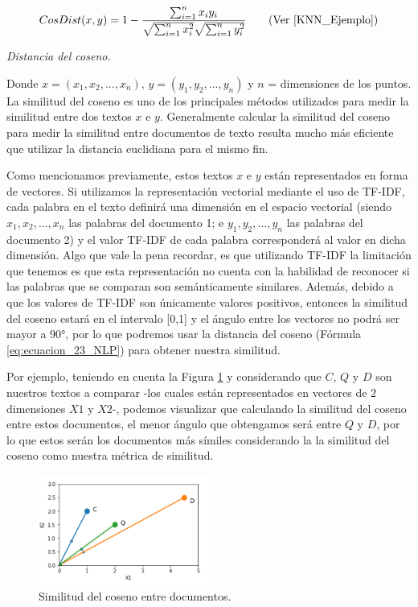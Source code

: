 \documentclass[12pt,a4paper]{article}
\begin{document}
\begin{sloppypar}
\begin{equation}\label{eq:ecuacion_23_NLP}
CosDist(x,y) = 1 - \frac{\sum_{i=1}^{n} x_{i} y_{i}} { \sqrt{\sum_{i=1}^{n} x_{i}^{2}}  \sqrt{\sum_{i=1}^{n} y_{i}^{2}} }     \qquad \text{(Ver \cite{KNN_Ejemplo})}
\end{equation}
\begin{center}
\textit{Distancia del coseno.}
\end{center}

Donde $x= (x_1,x_2,..., x_n)$, $y = (y_1,y_2,...,y_n)$ y $n$ = dimensiones de los puntos.
\\

La similitud del coseno es uno de los principales métodos utilizados para medir la similitud entre dos textos $x$ e $y$. Generalmente calcular la similitud del coseno para medir la similitud entre documentos de texto resulta mucho más eficiente que utilizar la distancia euclidiana para el mismo fin\cite{similarity_survey}.

Como mencionamos previamente, estos textos $x$ e $y$ están representados en forma de vectores. Si utilizamos la representación vectorial mediante el uso de TF-IDF, cada palabra en el texto definirá una dimensión en el espacio vectorial (siendo $x_1, x_2,..., x_n$ las palabras del documento 1; e $y_1, y_2,..., y_n$ las palabras del documento 2) y el valor TF-IDF de cada palabra corresponderá al valor en dicha dimensión. Algo que vale la pena recordar, es que utilizando TF-IDF la limitación que tenemos es que esta representación no cuenta con la habilidad de reconocer si las palabras que se comparan son semánticamente similares. Además, debido a que los valores de TF-IDF son únicamente valores positivos, entonces la similitud del coseno estará en el intervalo [0,1] y el ángulo entre los vectores no podrá ser mayor a 90°, por lo que podremos usar la distancia del coseno (Fórmula \ref{eq:ecuacion_23_NLP}) para obtener nuestra similitud\cite{NLP_19}.

Por ejemplo, teniendo en cuenta la Figura \ref{fig:Imagen_NLP_35} y considerando que $C$, $Q$ y $D$ son nuestros textos a comparar -los cuales están representados en vectores de 2 dimensiones $X1$ y $X2$-, podemos visualizar que calculando la similitud del coseno entre estos documentos, el menor ángulo que obtengamos será entre $Q$ y $D$, por lo que estos serán los documentos más símiles considerando la la similitud del coseno como nuestra métrica de similitud.  

\begin{figure}[H]    
 \centering
 \includegraphics[width=0.5\textwidth]{images/NLP/35.png}
 \caption{Similitud del coseno entre documentos\cite{NLP_19}.}
 \label{fig:Imagen_NLP_35}
\end{figure}


\end{sloppypar}
\end{document}
